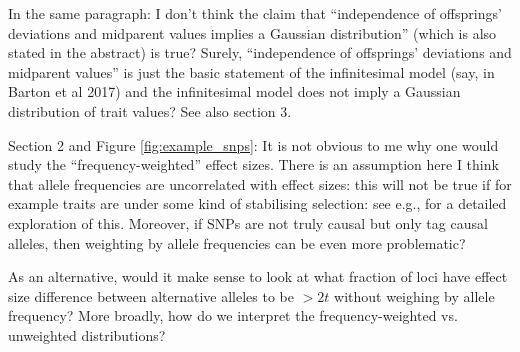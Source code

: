 
\begin{point}{\revref}
In the same paragraph: I don't think the claim that ``independence of offsprings' deviations and midparent values implies a Gaussian distribution'' (which is also stated in the abstract) is true? Surely, ``independence of offsprings' deviations and midparent values'' is just the basic statement of the infinitesimal model (say, in Barton et al 2017) and the infinitesimal model does not imply a Gaussian distribution of trait values? See also section 3.
\end{point}


\begin{point}{}
    Section 2 and Figure \ref{fig:example_snps}: It is not obvious to me why one would study the ``frequency-weighted'' effect sizes. There is an assumption here I think that allele frequencies are uncorrelated with effect sizes: this will not be true if for example traits are under some kind of stabilising selection: see e.g., \citet{simons2018population} for a detailed exploration of this. Moreover, if SNPs are not truly causal but only tag causal alleles, then weighting by allele frequencies can be even more problematic?

As an alternative, would it make sense to look at what fraction of loci have effect size difference between alternative alleles to be $>2t$ without weighing by allele frequency?
More broadly, how do we interpret the frequency-weighted vs. unweighted distributions?
\end{point}

